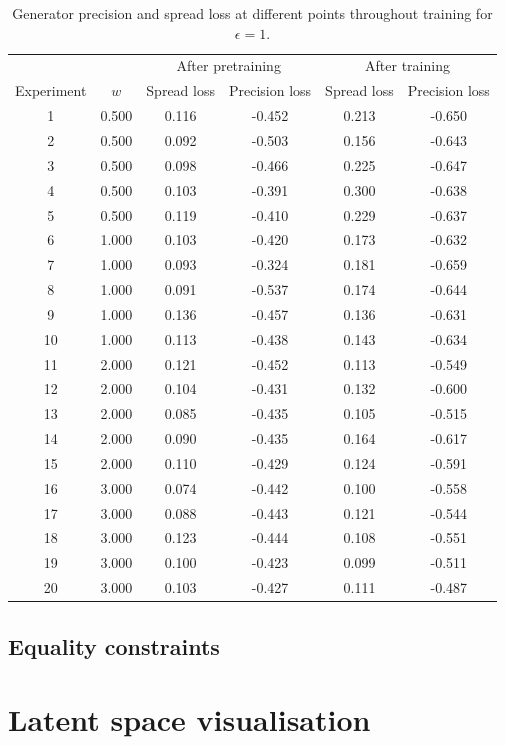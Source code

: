 \documentclass[../../main.tex]{subfiles}
\begin{document}
\begin{table}[H]
    \centering
    \begin{tabular}{*6c}
    \toprule
    {} & {} & \multicolumn{2}{c}{After pretraining} & \multicolumn{2}{c}{After training}\\
    Experiment&$w$&Spread loss&Precision loss&Spread loss&Precision loss\\
    \midrule
    1&0.500&0.116&-0.452&0.213&-0.650\\2&0.500&0.092&-0.503&0.156&-0.643\\3&0.500&0.098&-0.466&0.225&-0.647\\4&0.500&0.103&-0.391&0.300&-0.638\\5&0.500&0.119&-0.410&0.229&-0.637\\6&1.000&0.103&-0.420&0.173&-0.632\\7&1.000&0.093&-0.324&0.181&-0.659\\8&1.000&0.091&-0.537&0.174&-0.644\\9&1.000&0.136&-0.457&0.136&-0.631\\10&1.000&0.113&-0.438&0.143&-0.634\\11&2.000&0.121&-0.452&0.113&-0.549\\12&2.000&0.104&-0.431&0.132&-0.600\\13&2.000&0.085&-0.435&0.105&-0.515\\14&2.000&0.090&-0.435&0.164&-0.617\\15&2.000&0.110&-0.429&0.124&-0.591\\16&3.000&0.074&-0.442&0.100&-0.558\\
    17&3.000&0.088&-0.443&0.121&-0.544\\18&3.000&0.123&-0.444&0.108&-0.551\\19&3.000&0.100&-0.423&0.099&-0.511\\20&3.000&0.103&-0.427&0.111&-0.487\\
    \bottomrule
    \end{tabular}
    \caption{Generator precision and spread loss at different points throughout training for $\epsilon=1$.}
    \label{table:generatorTrainingProgression}
\end{table}

\subsection{Equality constraints}

\section{Latent space visualisation}
\end{document}
